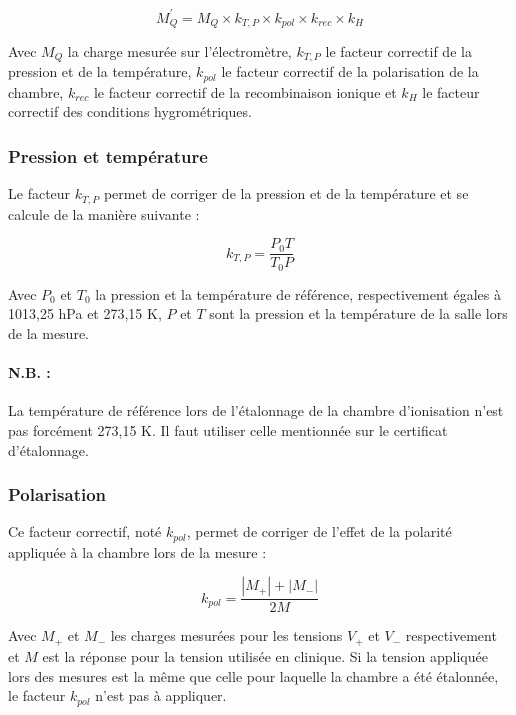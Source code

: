 \documentclass{article}
\begin{document}
\begin{equation}
  M_{Q}^{'} = M_Q \times k_{T,P} \times k_{pol} \times k_{rec} \times k_H
  \label{eq_corr_charge}
\end{equation}

Avec $M_Q$ la charge mesurée sur l'électromètre, $k_{T,P}$ le facteur correctif de la pression et de la température, $k_{pol}$ le facteur correctif de la polarisation de la chambre, $k_{rec}$ le facteur correctif de la recombinaison ionique et $k_H$ le facteur correctif des conditions hygrométriques.

\subsubsection{Pression et température}

Le facteur $k_{T,P}$ permet de corriger de la pression et de la température et se calcule de la manière suivante :

\begin{equation}
  k_{T,P} = \dfrac{P_0T}{T_0P}
  \label{eq_k_TP}
\end{equation}

Avec $P_0$ et $T_0$ la pression et la température de référence, respectivement égales à 1013,25 hPa et 273,15 K, $P$ et $T$ sont la pression et la température de la salle lors de la mesure.

\paragraph*{N.B. :} La température de référence lors de l'étalonnage de la chambre d'ionisation n'est pas forcément 273,15 K. Il faut utiliser celle mentionnée sur le certificat d'étalonnage.

\subsubsection{Polarisation}

Ce facteur correctif, noté $k_{pol}$, permet de corriger de l'effet de la polarité appliquée à la chambre lors de la mesure :

\begin{equation}
  k_{pol} = \dfrac{|M_+| + |M_-|}{2M}
  \label{eq_pol}
\end{equation}

Avec $M_+$ et $M_-$ les charges mesurées pour les tensions $V_+$ et $V_-$ respectivement et $M$ est la réponse pour la tension utilisée en clinique. Si la tension appliquée lors des mesures est la même que celle pour laquelle la chambre a été étalonnée, le facteur $k_{pol}$ n'est pas à appliquer.
\end{document}
